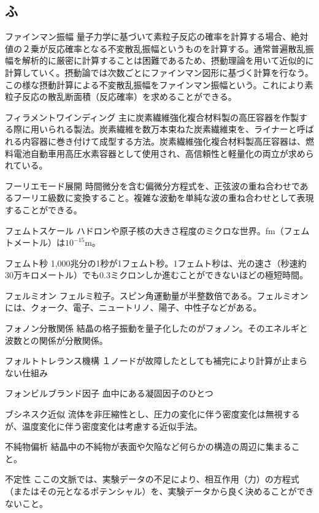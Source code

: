 \begin{用語集}
\section{ふ}
\item{ファインマン振幅}{}
{量子力学に基づいて素粒子反応の確率を計算する場合、絶対値の２乗が反応確率となる不変散乱振幅というものを計算する。通常普遍散乱振幅を解析的に厳密に計算することは困難であるため、摂動理論を用いて近似的に計算していく。摂動論では次数ごとにファインマン図形に基づく計算を行なう。この様な摂動計算による不変散乱振幅をファインマン振幅という。これにより素粒子反応の散乱断面積（反応確率）を求めることができる。}
\item{フィラメントワインディング}{}
{主に炭素繊維強化複合材料製の高圧容器を作製する際に用いられる製法。炭素繊維を数万本束ねた炭素繊維束を、ライナーと呼ばれる内容器に巻き付けて成型する方法。炭素繊維強化複合材料製高圧容器は、燃料電池自動車用高圧水素容器として使用され、高信頼性と軽量化の両立が求められている。}
\item{フーリエモード展開}{}
{時間微分を含む偏微分方程式を、正弦波の重ね合わせであるフーリエ級数に変換すること。複雑な波動を単純な波の重ね合わせとして表現することができる。}
\item{フェムトスケール}{}
{ハドロンや原子核の大きさ程度のミクロな世界。fm（フェムトメートル）は$10^{-15}$m。}
\item{フェムト秒}{}
{1,000兆分の1秒が1フェムト秒。1フェムト秒は、光の速さ（秒速約30万キロメートル）でも0.3ミクロンしか進むことができないほどの極短時間。}
\item{フェルミオン}{}
{フェルミ粒子。スピン角運動量が半整数倍である。フェルミオンには、クォーク、電子、ニュートリノ、陽子、中性子などがある。}
\item{フォノン分散関係}{}
{結晶の格子振動を量子化したのがフォノン。そのエネルギと波数との関係が分散関係。}
\item{フォルトトレランス機構}{}
{１ノードが故障したとしても補完により計算が止まらない仕組み}
\item{フォンビルブランド因子}{}
{血中にある凝固因子のひとつ}
\item{ブシネスク近似}{}
{流体を非圧縮性とし、圧力の変化に伴う密度変化は無視するが、温度変化に伴う密度変化は考慮する近似手法。}
\item{不純物偏析}{}
{結晶中の不純物が表面や欠陥など何らかの構造の周辺に集まること。}
\item{不定性}{}
{ここの文脈では、実験データの不足により、相互作用（力）の方程式（またはその元となるポテンシャル）を、実験データから良く決めることができないこと。}

\end{用語集}

